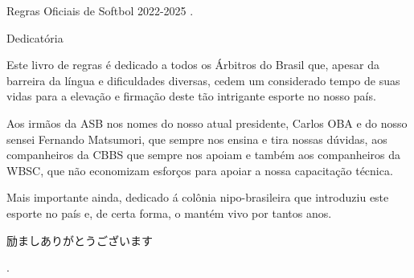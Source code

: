 \newpage
{\Huge Regras Oficiais de Softbol 2022-2025}
\clearpage
.

\vfill
\begin{center}
	\begin{minipage}{.6\textwidth}


		{\centering\large{Dedicatória}}

		\vspace{10mm}
		Este livro de regras é dedicado a todos os Árbitros do Brasil que, apesar da barreira  da língua e dificuldades diversas, cedem um considerado tempo de suas vidas para a elevação e firmação deste tão intrigante esporte no nosso país.

		Aos irmãos da ASB nos nomes do nosso atual presidente, Carlos OBA e do nosso sensei Fernando Matsumori, que sempre nos ensina e tira nossas dúvidas, aos companheiros da CBBS que sempre nos apoiam e também aos companheiros da WBSC, que não economizam esforços para apoiar a nossa capacitação técnica.

		Mais  importante  ainda, dedicado á colônia nipo-brasileira que introduziu este esporte no país e, de certa forma, o mantém vivo por tantos anos.

		\vspace{10mm}
		\begin{CJK}{UTF8}{min}	励ましありがとうございます\end{CJK}
	\end{minipage}
\end{center}
\vfill.

\clearpage
\dominitoc%
\tableofcontents*

